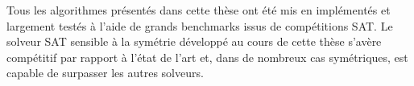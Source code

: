Tous les algorithmes présentés dans cette thèse ont été mis en implémentés et largement testés à l'aide de grands benchmarks issus de compétitions SAT. Le solveur SAT sensible à la symétrie développé au cours de cette thèse s'avère compétitif par rapport à l'état de l'art et, dans de nombreux cas symétriques, est capable de surpasser les autres solveurs.

%
%
%
%


